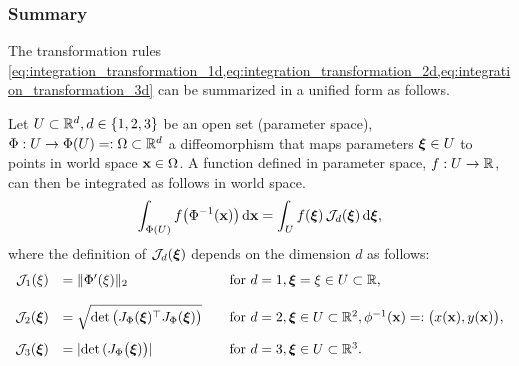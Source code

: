 \subsubsection{Summary}
The transformation rules \cref{eq:integration_transformation_1d,eq:integration_transformation_2d,eq:integration_transformation_3d} can be summarized in a unified form as follows.

Let $U \subset \mathbb{R}^d, d\in\{1,2,3\}$ be an open set (parameter space), $\Phi:U \to \Phi(U)=:\Omega \subset\mathbb{R}^d$ a diffeomorphism that maps parameters $\boldsymbol{\xi} \in U$ to points in world space $\textbf{x} \in \Omega$. A function defined in parameter space, $f:U\to \mathbb{R}$, can then be integrated as follows in world space.
%
\begin{equation}\label{eq:integration_transformation_dd}
  \begin{array}{lll}
    \ds\int_{\Phi(U)} f\big(\Phi^{-1}(\bfx)\big)\,\d \bfx = \ds\int_U f(\bfxi)\,\mathcal{J}_d(\bfxi)\,\d \bfxi,
  \end{array}
\end{equation}
where the definition of $\mathcal{J}_d(\boldsymbol{\xi})$  depends on the dimension $d$ as follows:
%
\begin{equation*}
  \begin{array}{rll}
    \mathcal{J}_1(\xi) &= \Vert \Phi'(\xi) \Vert_2 &\quad \text{for }d=1, \boldsymbol{\xi}=\xi \in U \subset \mathbb{R},\\[4mm]
    \mathcal{J}_2(\boldsymbol{\xi}) &= \sqrt{\hbox{det} \, \big(J_{\Phi}(\boldsymbol{\xi})^\top J_{\Phi}(\boldsymbol{\xi})\big)} &\quad \text{for }d=2, \boldsymbol{\xi}\in U \subset \mathbb{R}^2, \phi^{-1}(\textbf{x}) =: \big(x(\textbf{x}), y(\textbf{x})\big),\\[4mm]
    \mathcal{J}_3(\boldsymbol{\xi}) &= |\hbox{det} \, (J_{\Phi}\big(\boldsymbol{\xi})\big)| &\quad \text{for }d=3, \boldsymbol{\xi}\in U \subset \mathbb{R}^3.
  \end{array}
\end{equation*}

\newpage
{}


%


